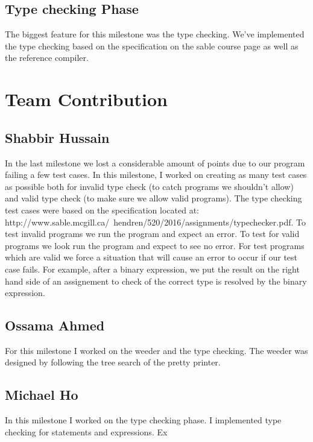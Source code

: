 \documentclass{article}
\begin{document}
\subsection{Type checking Phase}
The biggest feature for this milestone was the type checking. We've implemented the type checking based on the specification on the sable course page as well as the reference compiler. 


\section{Team Contribution}

\subsection{Shabbir Hussain}
In the last milestone we lost a considerable amount of points due to our program failing a few test cases. In this milestone, I worked on creating as many test cases as possible both for invalid type check (to catch programs we shouldn't allow) and valid type check  (to make sure we allow valid programs). The type checking test cases were based on the specification located at: http://www.sable.mcgill.ca/~hendren/520/2016/assignments/typechecker.pdf. To test invalid programs we run the program and expect an error. To test for valid programs we look run the program and expect to see no error. For test programs which are valid we force a situation that will cause an error to occur if our test case fails. For example, after a binary expression, we put the result on the right hand side of an assignement to check of the correct type is resolved by the binary expression.


\subsection{Ossama Ahmed}
For this milestone I worked on the weeder and the type checking. The weeder was designed by following the tree search of the pretty printer. 

\subsection{Michael Ho}
In this milestone I worked on the type checking phase. I implemented type checking for statements and expressions. Ex



\end{document}
